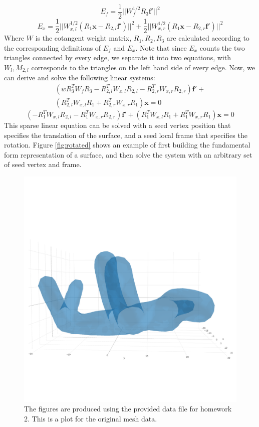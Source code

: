 \documentclass{6838publ}
\begin{document}
\[E_f = \frac{1}{2} ||W_f^{1/2} R_3 \mathbf{f'}||^2\]
\[E_x = \frac{1}{2} ||W_{x,l}^{1/2} (R_1 \mathbf{x} - R_{2, l}
\mathbf{f'}) ||^2 + \frac{1}{2} ||W_{x,r}^{1/2} (R_1 \mathbf{x} -
R_{2, r} \mathbf{f'}) ||^2\] Where $W$ is the cotangent weight matrix,
$R_{1}, R_{2}, R_{3}$ are calculated according to the corresponding
definitions of $E_{f}$ and $E_{x}$. Note that since $E_{x}$ counts the
two triangles connected by every edge, we separate it into two
equations, with $W_{l}, M_{2,l}$ corresponds to the triangles on the
left hand side of every edge. Now, we can derive and solve the
following linear systems:
\begin{equation*}
\begin{split} (wR_3^T W_f R_3 - R_{2, l}^T W_{x, l} R_{2, l} - R_{2,
r}^T W_{x, r} R_{2, r})\mathbf{f'} + \\ (R_{2, l}^T W_{x, l} R_1 +
R_{2, r}^T W_{x, r} R_1)\mathbf{x} = 0
\end{split}
\end{equation*}
\[( - R_1^T W_{x, l} R_{2, l} - R_1^T W_{x, r} R_{2, r})\mathbf{f'} +
(R_1^T W_{x, l} R_1 + R_1^T W_{x, r} R_1)\mathbf{x} = 0\] This sparse
linear equation can be solved with a seed vertex position that
specifies the translation of the surface, and a seed local frame that
specifies the rotation. Figure \ref{fig:rotated} shows an example of
first building the fundamental form representation of a surface, and
then solve the system with an arbitrary set of seed vertex and frame.
\begin{figure}[t!]  \centering
  \includegraphics[width=.6\linewidth]{original}
  \caption{The figures are produced using the provided data file for
homework 2. This is a plot for the original mesh data. }
  \label{fig:original}
\end{figure}
\end{document}

